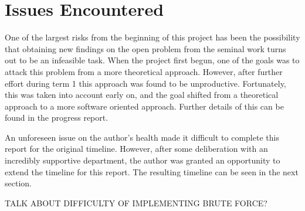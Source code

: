 \section{Issues Encountered}

One of the largest risks from the beginning of this project has been the possibility that obtaining new findings on the open problem from the seminal work \cite{chistikov2020re} turns out to be an infeasible task. When the project first begun, one of the goals was to attack this problem from a more theoretical approach. However, after further effort during term 1 this approach was found to be unproductive. 
Fortunately, this was taken into account early on, and the goal shifted from a theoretical approach to a more software oriented approach. Further details of this can be found in the progress report.

An unforeseen issue on the author's health made it difficult to complete this report for the original timeline. However, after some deliberation with an incredibly supportive department, the author was granted an opportunity to extend the timeline for this report. The resulting timeline can be seen in the next section.

TALK ABOUT DIFFICULTY OF IMPLEMENTING BRUTE FORCE?